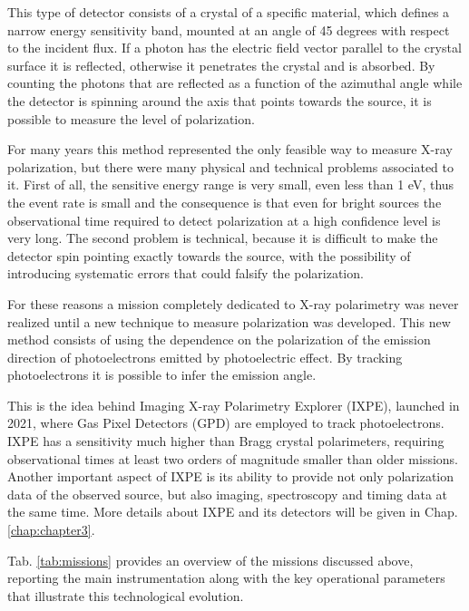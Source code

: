 This type of detector consists of a crystal of a specific material, which defines a narrow energy sensitivity band, mounted at an angle of 45 degrees with respect to the incident flux. If a photon has the electric field vector parallel to the crystal surface it is reflected, otherwise it penetrates the crystal and is absorbed. By counting the photons that are reflected as a function of the azimuthal angle while the detector is spinning around the axis that points towards the source, it is possible to measure the level of polarization.

For many years this method represented the only feasible way to measure X-ray polarization, but there were many physical and technical problems associated to it. First of all, the sensitive energy range is very small, even less than 1 eV, thus the event rate is small and the consequence is that even for bright sources the observational time required to detect polarization at a high confidence level is very long. The second problem is technical, because it is difficult to make the detector spin pointing exactly towards the source, with the possibility of introducing systematic errors that could falsify the polarization.

For these reasons a mission completely dedicated to X-ray polarimetry was never realized until a new technique to measure polarization was developed. This new method consists of using the dependence on the polarization of the emission direction of photoelectrons emitted by photoelectric effect. By tracking photoelectrons it is possible to infer the emission angle.

This is the idea behind Imaging X-ray Polarimetry Explorer (IXPE), launched in 2021, where Gas Pixel Detectors (GPD) are employed to track photoelectrons. IXPE has a sensitivity much higher than Bragg crystal polarimeters, requiring observational times at least two orders of magnitude smaller than older missions. Another important aspect of IXPE is its ability to provide not only polarization data of the observed source, but also imaging, spectroscopy and timing data at the same time. More details about IXPE and its detectors will be given in Chap. \ref{chap:chapter3}.

Tab. \ref{tab:missions} provides an overview of the missions discussed above, reporting the main instrumentation along with the key operational parameters that illustrate this technological evolution.

